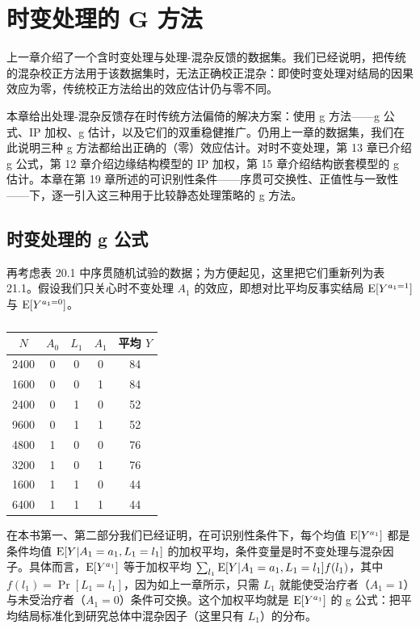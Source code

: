 \chapter[\hspace{0.6em}时变处理的 G 方法]{时变处理的 G 方法}

上一章介绍了一个含时变处理与处理-混杂反馈的数据集。我们已经说明，把传统的混杂校正方法用于该数据集时，无法正确校正混杂：即使时变处理对结局的因果效应为零，传统校正方法给出的效应估计仍与零不同。

本章给出处理-混杂反馈存在时传统方法偏倚的解决方案：使用 g 方法——g 公式、IP 加权、g 估计，以及它们的双重稳健推广。仍用上一章的数据集，我们在此说明三种 g 方法都给出正确的（零）效应估计。对时不变处理，第 13 章已介绍 g 公式，第 12 章介绍边缘结构模型的 IP 加权，第 15 章介绍结构嵌套模型的 g 估计。本章在第 19 章所述的可识别性条件——序贯可交换性、正值性与一致性——下，逐一引入这三种用于比较静态处理策略的 g 方法。

\section{时变处理的 g 公式}

再考虑表 20.1 中序贯随机试验的数据；为方便起见，这里把它们重新列为表 21.1。假设我们只关心时不变处理 $A_1$ 的效应，即想对比平均反事实结局 $\mathrm{E}[Y^{a_1=1}]$ 与 $\mathrm{E}[Y^{a_1=0}]$。

\begin{table}[htbp]
\centering
\caption{}
\label{tab:21.1}
\small
\begin{tabular}{ccccc}
\toprule
$N$ & $A_0$ & $L_1$ & $A_1$ & 平均 $Y$\\
\midrule
2400 & 0 & 0 & 0 & 84\\
1600 & 0 & 0 & 1 & 84\\
2400 & 0 & 1 & 0 & 52\\
9600 & 0 & 1 & 1 & 52\\
4800 & 1 & 0 & 0 & 76\\
3200 & 1 & 0 & 1 & 76\\
1600 & 1 & 1 & 0 & 44\\
6400 & 1 & 1 & 1 & 44\\
\bottomrule
\end{tabular}
\end{table}

在本书第一、第二部分我们已经证明，在可识别性条件下，每个均值 $\mathrm{E}[Y^{a_1}]$ 都是条件均值 $\mathrm{E}[Y|A_1=a_1,L_1=l_1]$ 的加权平均，条件变量是时不变处理与混杂因子。具体而言，$\mathrm{E}[Y^{a_1}]$ 等于加权平均 $\sum_{l_1}\mathrm{E}[Y|A_1=a_1,L_1=l_1]f(l_1)$，其中 $f(l_1)=\Pr[L_1=l_1]$，因为如上一章所示，只需 $L_1$ 就能使受治疗者（$A_1=1$）与未受治疗者（$A_1=0$）条件可交换。这个加权平均就是 $\mathrm{E}[Y^{a_1}]$ 的 g 公式：把平均结局标准化到研究总体中混杂因子（这里只有 $L_1$）的分布。

